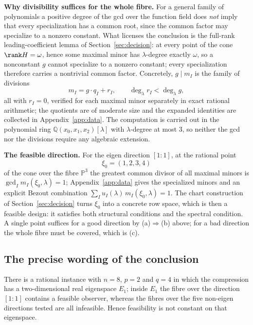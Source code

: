 \textbf{Why divisibility suffices for the whole fibre.} For a general family of polynomials a positive
degree of the gcd over the function field does \emph{not} imply that every specialization has a common
root, since the common factor may specialize to a nonzero constant. What licenses the conclusion is the
full-rank leading-coefficient lemma of Section~\ref{sec:decision}: at every point of the cone
$\rank H=\omega$, hence some maximal minor has $\lambda$-degree exactly $\omega$, so a nonconstant $g$
cannot specialize to a nonzero constant; every specialization therefore carries a nontrivial common
factor. Concretely, $g\mid m_I$ is the family of divisions
\begin{equation}\label{sec6:eq:division}
m_I=g\cdot q_I+r_I,\qquad \deg_\lambda r_I<\deg_\lambda g,
\end{equation}
all with $r_I=0$, verified for each maximal minor separately in exact rational arithmetic; the
quotients are of moderate size and the expanded identities are collected in Appendix~\ref{app:data}.
The computation is carried out in the polynomial ring $\mathbb{Q}(x_0,x_1,x_2)[\lambda]$ with
$\lambda$-degree at most $3$, so neither the gcd nor the divisions require any algebraic extension.

\textbf{The feasible direction.} For the eigen direction $[1\!:\!1]$, at the rational point
\begin{equation}\label{sec6:eq:x0}
\xi_0=(1,2,3,4)
\end{equation}
of the cone over the fibre $\mathbb{P}^{3}$ the greatest common divisor of all maximal minors is
$\gcd_I m_I(\xi_0,\lambda)=1$; Appendix~\ref{app:data} gives the specialized minors and an explicit
Bezout combination $\sum_I u_I(\lambda)\,m_I(\xi_0,\lambda)=1$. The chart construction of
Section~\ref{sec:decision} turns $\xi_0$ into a concrete row space, which is then a feasible design: it
satisfies both structural conditions and the spectral condition. A single point suffices for a good
direction by (a)$\Rightarrow$(b) above; for a bad direction the whole fibre must be covered, which is
(c).

\subsection{The precise wording of the conclusion}\label{sec6:sub:conclusion}

\begin{prop}[counterexample]\label{sec6:prop:nonconstant}
There is a rational instance with $n=8$, $p=2$ and $q=4$ in which the compression has a
two-dimensional real eigenspace $E_1$; inside $E_1$ the fibre over the direction $[1\!:\!1]$ contains
a feasible observer, whereas the fibres over the five non-eigen directions tested are all infeasible.
Hence feasibility is not constant on that eigenspace.
\end{prop}


